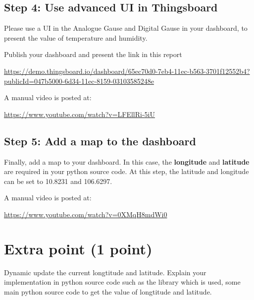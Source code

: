 \documentclass[a4paper,11pt]{article}
\theoremstyle{mytheor}
\begin{document}
\subsection{Step 4: Use advanced UI in Thingsboard}
Please use a UI in the Analogue Gause and Digital Gause in your dashboard, to present the value of temperature and humidity.

Publish your dashboard and present the link in this report
\begin{center}
    \url{https://demo.thingsboard.io/dashboard/65ec70d0-7eb4-11ec-b563-3701f12552b4?publicId=047b5000-6d34-11ec-8159-03103585248e}
\end{center}

A manual video is posted at:
\begin{center}
    \url{https://www.youtube.com/watch?v=LFEllRi-5iU}
\end{center}

\subsection{Step 5: Add a map to the dashboard}
Finally, add a map to your dashboard. In this case, the \textbf{longitude} and \textbf{latitude} are required in your python source code. At this step, the latitude and longitude can be set to 10.8231 and 106.6297.

A manual video is posted at:
\begin{center}
    \url{https://www.youtube.com/watch?v=0XMqH8mdWi0}
\end{center}

\section{Extra point (1 point)}
Dynamic update the current longtitude and latitude. Explain your implementation in python source code such as the library which is used, some main python source code to get the value of longtitude and latitude.
\end{document}
